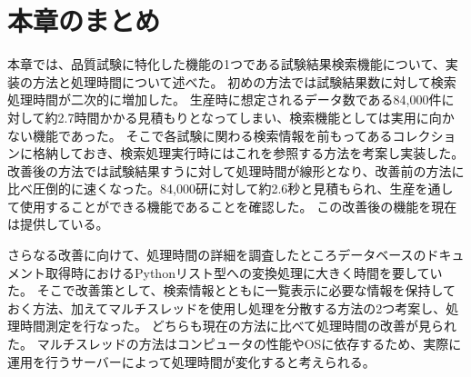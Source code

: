 \section{本章のまとめ}
本章では、品質試験に特化した機能の1つである試験結果検索機能について、実装の方法と処理時間について述べた。
初めの方法では試験結果数に対して検索処理時間が二次的に増加した。
生産時に想定されるデータ数である84,000件に対して約2.7時間かかる見積もりとなってしまい、検索機能としては実用に向かない機能であった。
そこで各試験に関わる検索情報を前もってあるコレクションに格納しておき、検索処理実行時にはこれを参照する方法を考案し実装した。
改善後の方法では試験結果すうに対して処理時間が線形となり、改善前の方法に比べ圧倒的に速くなった。84,000研に対して約2.6秒と見積もられ、生産を通して使用することができる機能であることを確認した。
この改善後の機能を現在は提供している。

さらなる改善に向けて、処理時間の詳細を調査したところデータベースのドキュメント取得時におけるPythonリスト型への変換処理に大きく時間を要していた。
そこで改善策として、検索情報とともに一覧表示に必要な情報を保持しておく方法、加えてマルチスレッドを使用し処理を分散する方法の2つ考案し、処理時間測定を行なった。
どちらも現在の方法に比べて処理時間の改善が見られた。
マルチスレッドの方法はコンピュータの性能やOSに依存するため、実際に運用を行うサーバーによって処理時間が変化すると考えられる。

